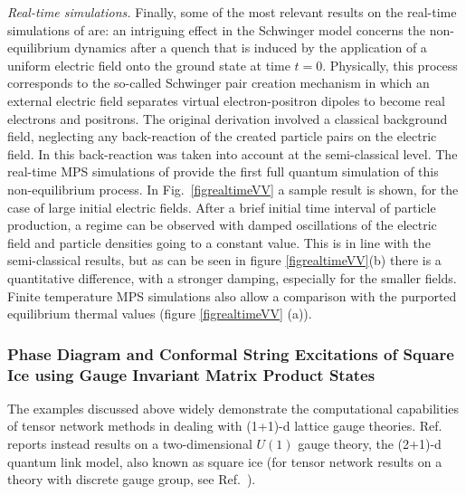 \documentclass[epj,final]{svjour}
\begin{document}
\emph{Real-time simulations.} Finally, some of the most relevant results on the real-time simulations of \cite{buyens2014matrix, Buyens2017} are: an intriguing effect in the Schwinger model concerns the non-equilibrium dynamics after a quench that is induced by the application of a uniform electric field onto the ground state at time $t=0$. Physically, this process corresponds to the so-called Schwinger pair creation mechanism \cite{Schwinger1951} in which an external electric field separates virtual electron-positron dipoles to become real electrons and positrons. The original derivation \cite{Schwinger1951} involved a classical background field, neglecting any back-reaction of the created particle pairs on the electric field. In \cite{Kluger1992,Hebenstreit2013} this back-reaction was taken into account at the semi-classical level. The real-time MPS simulations of \cite{buyens2014matrix, Buyens2017} provide the first full quantum simulation of this non-equilibrium process. In Fig.~\ref{figrealtimeVV} a sample result is shown, for the case of large initial electric fields. After a brief initial time interval of particle production, a regime can be observed with damped oscillations of the electric field and particle densities going to a constant value. This is in line with the semi-classical results, but as can be seen in figure \ref{figrealtimeVV}(b)  there is a quantitative difference, with a stronger damping, especially for the smaller fields. Finite temperature MPS simulations also allow a comparison with the purported equilibrium thermal values (figure \ref{figrealtimeVV} (a)).    

\subsubsection{Phase Diagram and Conformal String Excitations of Square Ice using Gauge Invariant Matrix Product States~\cite{tschirsich2019phase}}

The examples discussed above widely demonstrate the computational capabilities of tensor network methods in dealing with (1+1)-d lattice gauge theories. Ref.~\cite{tschirsich2019phase} reports instead results on a two-dimensional  $U(1)$ gauge theory, the (2+1)-d quantum link model, also known as square ice (for tensor network results on a theory with discrete gauge group, see Ref.~\cite{Tagliacozzo2011}). 
\end{document}
